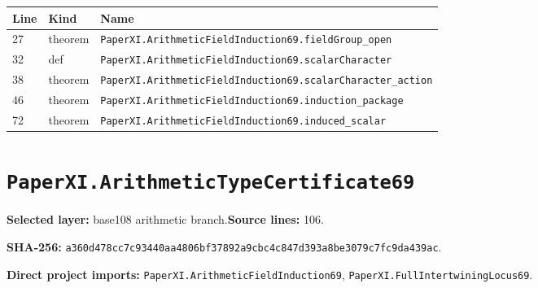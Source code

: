 \documentclass[10pt,oneside]{book}
\begin{document}
\begin{longtable}{@{}p{}p{}p{}@{}}\toprule Line&Kind&Name\\\midrule\endhead

27&theorem&\nolinkurl{PaperXI.ArithmeticFieldInduction69.fieldGroup_open}\\

32&def&\nolinkurl{PaperXI.ArithmeticFieldInduction69.scalarCharacter}\\

38&theorem&\nolinkurl{PaperXI.ArithmeticFieldInduction69.scalarCharacter_action}\\

46&theorem&\nolinkurl{PaperXI.ArithmeticFieldInduction69.induction_package}\\

72&theorem&\nolinkurl{PaperXI.ArithmeticFieldInduction69.induced_scalar}\\

\bottomrule\end{longtable}

\section{\texorpdfstring{\nolinkurl{PaperXI.ArithmeticTypeCertificate69}}{PaperXI.ArithmeticTypeCertificate69}}\label{module:PaperXI.ArithmeticTypeCertificate69}

\textbf{Selected layer:} base108 arithmetic branch.\quad\textbf{Source lines:} 106.\par\textbf{SHA-256:} {\scriptsize\nolinkurl{a360d478cc7c93440aa4806bf37892a9cbc4c847d393a8be3079c7fc9da439ac}}.


\textbf{Direct project imports:} \nolinkurl{PaperXI.ArithmeticFieldInduction69}, \nolinkurl{PaperXI.FullIntertwiningLocus69}.
\end{document}
